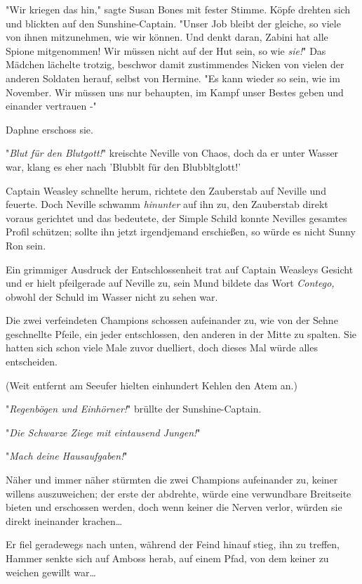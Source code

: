 {"Wir kriegen das hin," sagte Susan Bones mit fester Stimme. Köpfe drehten sich und blickten auf den Sunshine-Captain. "Unser Job bleibt der gleiche, so viele von ihnen mitzunehmen, wie wir können. Und denkt daran, Zabini hat alle Spione mitgenommen! Wir müssen nicht auf der Hut sein, so wie \emph{sie!}" Das Mädchen lächelte trotzig, beschwor damit zustimmendes Nicken von vielen der anderen Soldaten herauf, selbst von Hermine. "Es kann wieder so sein, wie im November. Wir müssen uns nur behaupten, im Kampf unser Bestes geben und einander vertrauen -"

Daphne erschoss sie.

\later

"\emph{Blut für den Blutgott!}" kreischte Neville von Chaos, doch da er unter Wasser war, klang es eher nach 'Blubblt für den Blubbltglott!'

Captain Weasley schnellte herum, richtete den Zauberstab auf Neville und feuerte. Doch Neville schwamm \emph{hinunter} auf ihn zu, den Zauberstab direkt voraus gerichtet und das bedeutete, der Simple Schild konnte Nevilles gesamtes Profil schützen; sollte ihn jetzt irgendjemand erschießen, so würde es nicht Sunny Ron sein.

Ein grimmiger Ausdruck der Entschlossenheit trat auf Captain Weasleys Gesicht und er hielt pfeilgerade auf Neville zu, sein Mund bildete das Wort \emph{Contego,} obwohl der Schuld im Wasser nicht zu sehen war.

Die zwei verfeindeten Champions schossen aufeinander zu, wie von der Sehne geschnellte Pfeile, ein jeder entschlossen, den anderen in der Mitte zu spalten. Sie hatten sich schon viele Male zuvor duelliert, doch dieses Mal würde alles entscheiden.

(Weit entfernt am Seeufer hielten einhundert Kehlen den Atem an.)

"\emph{Regenbögen und Einhörner!}" brüllte der Sunshine-Captain.

"\emph{Die Schwarze Ziege mit eintausend Jungen!}"

"\emph{Mach deine Hausaufgaben!}"

Näher und immer näher stürmten die zwei Champions aufeinander zu, keiner willens auszuweichen; der erste der abdrehte, würde eine verwundbare Breitseite bieten und erschossen werden, doch wenn keiner die Nerven verlor, würden sie direkt ineinander krachen…

Er fiel geradewegs nach unten, während der Feind hinauf stieg, ihn zu treffen, Hammer senkte sich auf Amboss herab, auf einem Pfad, von dem keiner zu weichen gewillt war…

}
